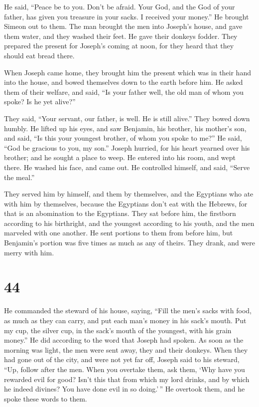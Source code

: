  He said, ``Peace be to you. Don't be afraid. Your God,
and the God of your father, has given you treasure in your sacks. I
received your money.'' He brought Simeon out to them. 
The man brought the men into Joseph's house, and gave them water, and
they washed their feet. He gave their donkeys fodder. 
They prepared the present for Joseph's coming at noon, for they heard
that they should eat bread there.

 When Joseph came home, they brought him the present
which was in their hand into the house, and bowed themselves down to the
earth before him.  He asked them of their welfare, and
said, ``Is your father well, the old man of whom you spoke? Is he yet
alive?''

 They said, ``Your servant, our father, is well. He is
still alive.'' They bowed down humbly.  He lifted up his
eyes, and saw Benjamin, his brother, his mother's son, and said, ``Is
this your youngest brother, of whom you spoke to me?'' He said, ``God be
gracious to you, my son.''  Joseph hurried, for his heart
yearned over his brother; and he sought a place to weep. He entered into
his room, and wept there.  He washed his face, and came
out. He controlled himself, and said, ``Serve the meal.''

 They served him by himself, and them by themselves, and
the Egyptians who ate with him by themselves, because the Egyptians
don't eat with the Hebrews, for that is an abomination to the Egyptians.
 They sat before him, the firstborn according to his
birthright, and the youngest according to his youth, and the men
marveled with one another.  He sent portions to them from
before him, but Benjamin's portion was five times as much as any of
theirs. They drank, and were merry with him.

\hypertarget{section-43}{%
\section{44}\label{section-43}}

 He commanded the steward of his house, saying, ``Fill the
men's sacks with food, as much as they can carry, and put each man's
money in his sack's mouth.  Put my cup, the silver cup, in
the sack's mouth of the youngest, with his grain money.'' He did
according to the word that Joseph had spoken.  As soon as
the morning was light, the men were sent away, they and their donkeys.
 When they had gone out of the city, and were not yet far
off, Joseph said to his steward, ``Up, follow after the men. When you
overtake them, ask them, `Why have you rewarded evil for good?
 Isn't this that from which my lord drinks, and by which
he indeed divines? You have done evil in so doing.'\,'' 
He overtook them, and he spoke these words to them.

